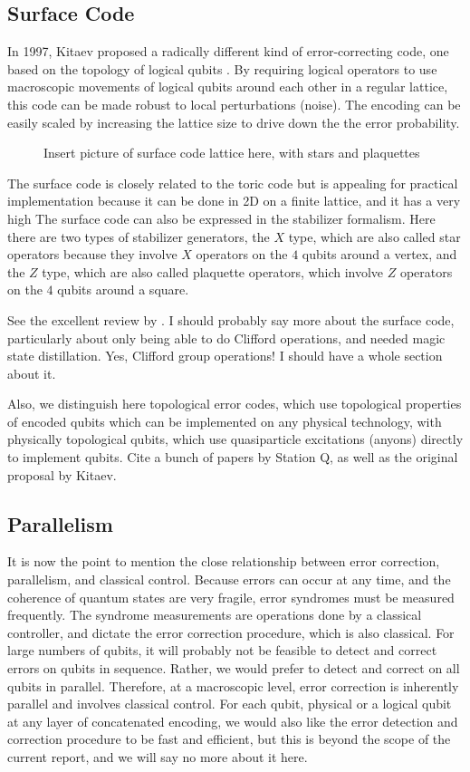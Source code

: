 \subsection{Surface Code}

In 1997, Kitaev proposed a radically different kind of error-correcting code,
one based on the topology of logical qubits \cite{Kitaev1997}.
By requiring logical operators to
use macroscopic movements of logical qubits around each other in a regular
lattice, this code can be made robust to local perturbations (noise). The
encoding can be easily scaled by increasing the lattice size to drive down the
the error probability.

\begin{figure}
\caption{Insert picture of surface code lattice here, with stars and plaquettes}
\end{figure}

The surface code is closely related to the toric code but is appealing for
practical implementation because it can be done in 2D on a finite lattice, and
it has a very high
The surface code can also be expressed in the stabilizer formalism. Here there
are two types of stabilizer generators, the $X$ type, which are also called
star operators because they involve $X$ operators on the $4$ qubits around a 
vertex, and the $Z$ type, which are also called plaquette operators, which
involve $Z$ operators on the $4$ qubits around a square.

See the excellent review by \cite{Fowler2007}. I should probably say more about
the surface code, particularly about only being able to do Clifford operations,
and needed magic state distillation. Yes, Clifford group operations! I should
have a whole section about it.

Also, we distinguish here topological error codes, which use topological
properties of encoded qubits which can be implemented on any physical
technology, with physically topological qubits, which use quasiparticle
excitations (anyons) directly to implement qubits. Cite a bunch of papers
by Station Q, as well as the original proposal by Kitaev.

\subsection{Parallelism}

It is now the point to mention the close relationship between error correction,
parallelism, and classical control. Because errors can occur at any time,
and the coherence of quantum states are very fragile, error syndromes must be
measured frequently. The syndrome measurements are operations done by a
classical controller, and dictate the error correction procedure, which is
also classical. For large numbers of qubits, it will probably not be
feasible to detect and correct errors on qubits in sequence. Rather, we would
prefer to detect and correct on all qubits in parallel. Therefore, at a
macroscopic level, error correction is inherently parallel and involves
classical control. For each qubit, physical or a logical qubit at any
layer of concatenated encoding, we would also like the error detection
and correction procedure to be fast and efficient, but this is beyond the
scope of the current report, and we will say no more about it here.